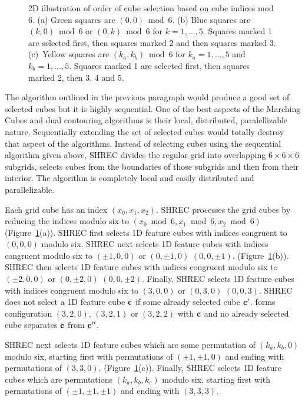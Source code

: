 \begin{figure}[t]
\caption{2D illustration of order of cube selection based 
on cube indices mod 6.
(a) Green squares are $(0,0) \bmod 6$.
(b) Blue squares are $(k,0) \bmod 6$ or $(0,k) \bmod 6$ for $k=1,\ldots,5$.
Squares marked 1 are selected first, then squares marked 2
and then squares marked 3.
(c)~Yellow squares are $(k_a,k_b) \bmod 6$ for $k_a=1,\ldots,5$
and $k_b=1,\ldots,5$.
Squares marked 1 are selected first, then squares marked 2,
then 3, 4 and 5.
}
\label{fig:mod6}
\end{figure}

The algorithm outlined in the previous paragraph would produce
a good set of selected cubes but it is highly sequential.
One of the best aspects of the Marching Cubes and dual contouring algorithms
is their local, distributed, paralellizable nature.
Sequentially extending the set of selected cubes would totally destroy
that aspect of the algorithms.
Instead of selecting cubes using the sequential algorithm given above,
SHREC divides the regular grid 
into overlapping $6 \times 6 \times 6$ subgrids,
selects cubes from the boundaries of those subgrids 
and then from their interior.
The algorithm is completely local and easily distributed and parallelizable.

Each grid cube has an index $(x_0, x_1, x_2)$.
SHREC processes the grid cubes by reducing the indices modulo six
to $(x_0 \bmod 6, x_1 \bmod 6, x_2 \bmod 6)$ (Figure~\ref{fig:mod6}(a)).
SHREC first selects 1D feature cubes 
with indices congruent to $(0,0,0)$ modulo six.
SHREC next selects 1D feature cubes with indices congruent modulo six
to $(\pm 1,0,0)$ or $(0, \pm 1, 0)$ $(0, 0, \pm 1)$.
(Figure~\ref{fig:mod6}(b)).
SHREC then selects 1D feature cubes with indices congruent modulo six
to $(\pm 2,0,0)$ or $(0, \pm 2, 0)$ $(0, 0, \pm 2)$.
Finally, SHREC selects 1D feature cubes with indices congruent modulo six
to $(3,0,0)$ or $(0, 3, 0)$ $(0, 0, 3)$.
SHREC does not select a 1D feature cube $\mathbf{c}$ 
if some already selected cube $\mathbf{c}'$.
forms configuration $(3,2,0)$, $(3,2,1)$ or $(3,2,2)$ with $\mathbf{c}$
and no already selected cube separates $\mathbf{c}$ from $\mathbf{c}''$.

SHREC next selects 1D feature cubes which are some permutation
of $(k_a,k_b,0)$ modulo six,
starting first with permutations of $(\pm 1, \pm 1, 0)$
and ending with permutations of $(3, 3, 0)$.
(Figure~\ref{fig:mod6}(c)).
Finally, SHREC selects 1D feature cubes which are permutations
$(k_a, k_b, k_c)$ modulo six,
starting first with permutations of $(\pm 1, \pm 1, \pm 1)$
and ending with $(3, 3, 3)$.


